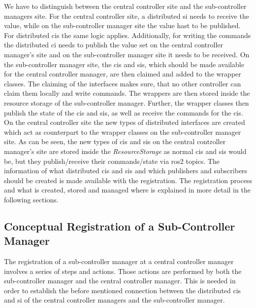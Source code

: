 We have to distinguish between the central controller site and the sub-controller managers site. For the central controller site, a distributed \gls{si} needs to receive the value, while on the sub-controller manager site the value hast to be published. For distributed \glspl{ci} the same logic applies. Additionally, for writing the commands the distributed \gls{ci} needs to publish the value set on the central controller manager's site and on the sub-controller manager site it needs to be received. On the sub-controller manager site, the \glspl{ci} and \glspl{si}, which should be made available for the central controller manager, are then claimed and added to the wrapper classes. The claiming of the interfaces makes sure, that no other controller can claim them locally and write commands. The wrappers are then stored inside the resource storage of the sub-controller manager. Further, the wrapper classes then publish the state of the \glspl{ci} and \glspl{si}, as well as receive the commands for the \glspl{ci}. On the central controller site the new types of distributed interfaces are created which act as counterpart to the wrapper classes on the sub-controller manager site. As can be seen, the new types of \glspl{ci} and \glspl{si} on the central controller manager's site are stored inside the \textit{ResourceStorage} as normal \glspl{ci} and \glspl{si} would be, but they publish/receive their commands/state via \gls{ros2} topics. \newline 
The information of what distributed \glspl{ci} and \glspl{si} and which publishers and subscribers should be created is made available with the registration. The registration process and what is created, stored and managed where is explained in more detail in the following sections.

\subsection{Conceptual Registration of a Sub-Controller Manager}\label{c4_sec_registraion_csi}
The registration of a sub-controller manager at a central controller manager involves a series of steps and actions. Those actions are performed by both the sub-controller manager and the central controller manager. This is needed in order to establish the before mentioned connection between the distributed \glspl{ci} and \gls{si} of the central controller managers and the sub-controller manager.

